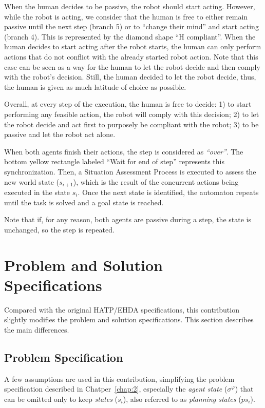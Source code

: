 When the human decides to be passive, the robot should start acting. 
However, while the robot is acting, we consider that the human is free to either remain passive until the next step (branch 5) or to ``change their mind'' and start acting (branch 4).
This is represented by the diamond shape ``H compliant''. When the human decides to start acting after the robot starts, the human can only perform actions that do not conflict with the already started robot action. Note that this case can be seen as a way for the human to let the robot decide and then comply with the robot's decision. Still, the human decided to let the robot decide, thus, the human is given as much latitude of choice as possible.

Overall, at every step of the execution, the human is free to decide: 1) to start performing any feasible action, the robot will comply with this decision; 2) to let the robot decide and act first to purposely be compliant with the robot; 3) to be passive and let the robot act alone.

When both agents finish their actions, the step is considered as \textit{``over''}. The bottom yellow rectangle labeled ``Wait for end of step'' represents this synchronization. Then, a Situation Assessment Process is executed to assess the new world state ($s_{i+1}$), which is the result of the concurrent actions being executed in the state $s_i$. Once the next state is identified, the automaton repeats until the task is solved and a goal state is reached.

Note that if, for any reason, both agents are passive during a step, the state is unchanged, so the step is repeated. 



\section{Problem and Solution Specifications}

Compared with the original HATP/EHDA specifications, this contribution slightly modifies the problem and solution specifications. This section describes the main differences.

    \subsection*{Problem Specification}

A few assumptions are used in this contribution, simplifying the problem specification described in Chatper~\ref{chap:2}, especially the \textit{agent state} ($\sigma^\varphi$) that can be omitted only to keep \textit{states} ($s_i$), also referred to as \textit{planning states} ($ps_i$). 

